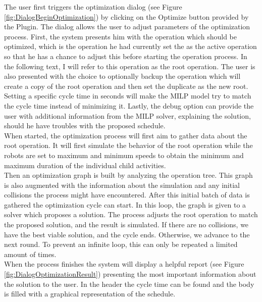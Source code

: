 The user first triggers the optimization dialog (see Figure \ref{fig:DialogBeginOptimization}) by clicking on the Optimize button provided by the Plugin. 
The dialog allows the user to adjust parameters of the optimization process. 
First, the system presents him with the operation which should be optimized, which is the operation he had currently set the as the active operation so that he has a chance to adjust this before starting the operation process. In the following text, I will refer to this operation as the root operation.
The user is also presented with the choice to optionally backup the operation which will create a copy of the root operation and then set the duplicate as the new root.
Setting a specific cycle time in seconds will make the MILP model try to match the cycle time instead of minimizing it.
Lastly, the debug option can provide the user with additional information from the MILP solver, explaining the solution, should he have troubles with the proposed schedule. \\


When started, the optimization process will first aim to gather data about the root operation. It will first simulate the behavior of the root operation while the robots are set to maximum and minimum speeds to obtain the minimum and maximum duration of the individual child activities.\\

Then an optimization graph is built by analyzing the operation tree. This graph is also augmented with the information about the simulation and any initial collisions the process might have encountered. After this initial batch of data is gathered the optimization cycle can start. In this loop, the graph is given to a solver which proposes a solution. The process adjusts the root operation to match the proposed solution, and the result is simulated. If there are no collisions, we have the best viable solution, and the cycle ends. Otherwise, we advance to the next round. To prevent an infinite loop, this can only be repeated a limited amount of times. \\

When the process finishes the system will display a helpful report (see Figure \ref{fig:DialogOptimizationResult}) presenting the most important information about the solution to the user. In the header the cycle time can be found and the body is filled with a graphical representation of the schedule.  

